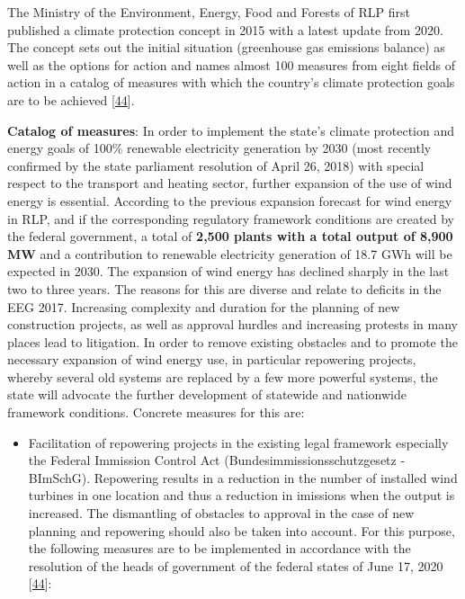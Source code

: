 \documentclass[a4paper,11pt]{article}
\providecommand{\tightlist}{%
  \setlength{\itemsep}{0pt}\setlength{\parskip}{0pt}}
\begin{document}
The Ministry of the Environment, Energy, Food and Forests of RLP first published a climate protection concept in
2015 with a latest update from 2020. The concept sets out the initial situation (greenhouse gas emissions balance) as well as the options for action and names almost 100 measures from eight fields of action in a catalog of measures with which the country's climate protection goals are to be achieved {[}\protect\hyperlink{ref-MinisteriumfurUmweltEnergieErnahrungundForsten.2020b}{44}{]}.

\textbf{Catalog of measures}: In order to implement the state's climate protection and energy goals of 100\% renewable electricity generation by 2030 (most recently confirmed by the state parliament resolution of April 26, 2018) with special respect to the transport and heating sector, further expansion of the use of wind energy is essential. According to the previous expansion forecast for wind energy in RLP, and if the corresponding regulatory framework conditions are created by the federal government, a total of \textbf{2,500 plants with a total output of 8,900 MW} and a contribution to renewable electricity generation of 18.7 GWh will be expected in 2030. The expansion of wind energy has declined sharply in the last two to three years. The reasons for this are diverse and relate to deficits in the EEG 2017. Increasing complexity and duration for the planning of new construction projects, as well as approval hurdles and increasing protests in many places lead to litigation. In order to remove existing obstacles and to promote the necessary expansion of wind energy use, in particular repowering projects, whereby several old systems are replaced by a few more powerful systems, the state will advocate the further development of statewide and nationwide framework conditions. Concrete measures for this are:
\begin{itemize}
\tightlist
\item
  Facilitation of repowering projects in the existing legal framework especially the Federal Immission Control Act (Bundesimmissionsschutzgesetz - BImSchG). Repowering results in a reduction in the number of installed wind turbines in one location and thus a reduction in imissions when the output is increased. The dismantling of obstacles to approval in the case of new planning and repowering should also be taken into account.
  For this purpose, the following measures are to be implemented in accordance with the resolution of the heads of government of the federal states of June 17, 2020 {[}\protect\hyperlink{ref-MinisteriumfurUmweltEnergieErnahrungundForsten.2020b}{44}{]}:
\end{itemize}
\end{document}
